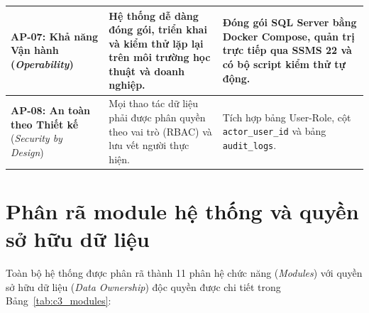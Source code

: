 \begin{table}[!ht]
\begin{tabularx}{\textwidth}{p{3.2cm}p{5.5cm}>{\raggedright\arraybackslash}X}
\midrule
\textbf{AP-07: Khả năng Vận hành} \newline (\textit{Operability}) & 
Hệ thống dễ dàng đóng gói, triển khai và kiểm thử lặp lại trên môi trường học thuật và doanh nghiệp. & 
Đóng gói SQL Server bằng Docker Compose, quản trị trực tiếp qua SSMS 22 và có bộ script kiểm thử tự động. \\
\midrule
\textbf{AP-08: An toàn theo Thiết kế} \newline (\textit{Security by Design}) & 
Mọi thao tác dữ liệu phải được phân quyền theo vai trò (RBAC) và lưu vết người thực hiện. & 
Tích hợp bảng User-Role, cột \texttt{actor\_user\_id} và bảng \texttt{audit\_logs}. \\
\bottomrule
\end{tabularx}
\end{table}

\section{Phân rã module hệ thống và quyền sở hữu dữ liệu}
\label{s:c3_modules}

Toàn bộ hệ thống được phân rã thành 11 phân hệ chức năng (\textit{Modules}) với quyền sở hữu dữ liệu (\textit{Data Ownership}) độc quyền được chi tiết trong Bảng~\ref{tab:c3_modules}:

